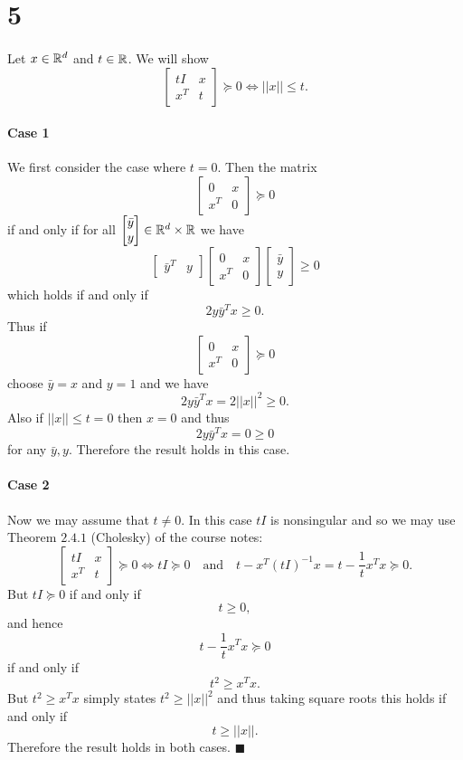 \documentclass[letterpaper,12pt,oneside,onecolumn]{article}
\begin{document}
\section*{5}
\paragraph{}
Let $x \in \mathbb{R}^d$ and $t\in \mathbb{R}$. We will show
$$\begin{bmatrix}tI & x \\ x^T & t \end{bmatrix} \succcurlyeq 0 \iff ||x|| \leq t.$$
\paragraph{Case 1}
We first consider the case where $t = 0$. Then the matrix $$\begin{bmatrix}0 & x \\ x^T & 0 \end{bmatrix} \succcurlyeq 0$$ if and only if for all $\begin{bmatrix} \bar{y} \\y \end{bmatrix} \in \mathbb{R}^d \times \mathbb{R}$ we have
$$\begin{bmatrix}\bar{y}^T & y \end{bmatrix} \begin{bmatrix}0 & x \\ x^T & 0 \end{bmatrix} \begin{bmatrix} \bar{y} \\y \end{bmatrix} \geq 0$$
which holds if and only if
$$2y\bar{y}^Tx \geq 0.$$
Thus if $$\begin{bmatrix}0 & x \\ x^T & 0 \end{bmatrix} \succcurlyeq 0$$ choose $\bar{y} = x$ and $y = 1$ and we have
$$2y\bar{y}^Tx  = 2||x||^2 \geq 0.$$
Also if $||x|| \leq t = 0$ then $x = 0$ and thus
$$2y\bar{y}^Tx = 0  \geq 0$$
for any $\bar{y}, y$. Therefore the result holds in this case.
\paragraph{Case 2}
Now we may assume that $t\neq 0$. In this case $tI$ is nonsingular and so we may use Theorem $2.4.1$ (Cholesky) of the course notes:
$$\begin{bmatrix}tI & x \\ x^T & t \end{bmatrix} \succcurlyeq 0 \iff tI \succcurlyeq 0 \quad \text{and}\quad t - x^T(tI)^{-1}x  = t - \frac{1}{t}x^Tx \succcurlyeq 0.$$
But $tI \succcurlyeq 0$ if and only if
$$ t\geq 0,$$
and hence 
$$t - \frac{1}{t}x^Tx \succcurlyeq 0 $$
if and only if $$t^2 \geq x^Tx.$$
But $t^2 \geq x^Tx$ simply states $t^2 \geq ||x||^2$ and thus taking square roots this holds if and only if
$$t \geq ||x||.$$
Therefore the result holds in both cases. $\blacksquare$
\end{document}
